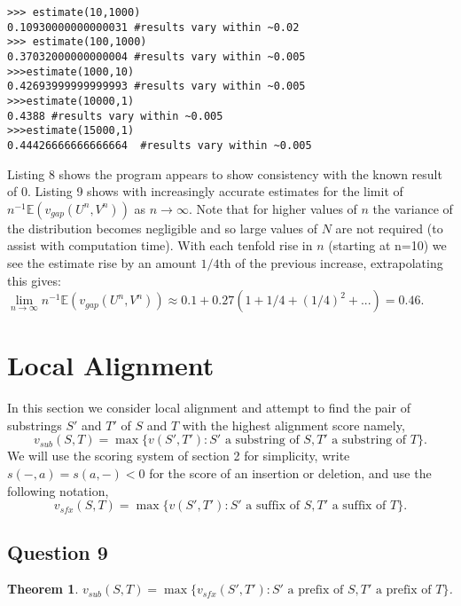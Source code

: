 \documentclass{article}
\newtheorem{theorem}{Theorem}[section]
\begin{document}
\begin{lstlisting}
>>> estimate(10,1000)
0.10930000000000031 #results vary within ~0.02
>>> estimate(100,1000)
0.37032000000000004 #results vary within ~0.005
>>>estimate(1000,10)
0.42693999999999993 #results vary within ~0.005
>>>estimate(10000,1) 
0.4388 #results vary within ~0.005
>>>estimate(15000,1)
0.44426666666666664  #results vary within ~0.005
\end{lstlisting}

Listing 8 shows the program appears to show consistency with the known result of 0. Listing 9 shows with increasingly accurate estimates for the limit of $n^{-1}\mathbb{E}(v_{gap}(U^n,V^n))$ as $n \to \infty$. Note that for higher values of $n$ the variance of the distribution becomes negligible and so large values of $N$ are not required (to assist with computation time). With each tenfold rise in $n$ (starting at n=10) we see the estimate rise by an amount $1/4$th of the previous increase, extrapolating this gives: $\underset{n\to \infty}{\lim} n^{-1}\mathbb{E}(v_{gap}(U^n,V^n)) \approx 0.1+0.27(1+1/4+(1/4)^2+...)=0.46$.

\section{Local Alignment}
In this section we consider local alignment and attempt to find the pair of substrings $S'$ and $T'$ of $S$ and $T$ with the highest alignment score namely,
\begin{equation*}
v_{sub}(S,T) = \max \{ v(S',T'):S' \text{ a substring of } S, T' \text{ a substring of } T \}.
\end{equation*} 
We will use the scoring system of section 2 for simplicity, write $s(-,a)=s(a,-)<0$ for the score of an insertion or deletion, and use the following notation,
\begin{equation*}
v_{sfx}(S,T)=\max \{ v(S',T'):S' \text{ a suffix of } S, T' \text{ a suffix of } T \}.
\end{equation*}

\subsection{Question 9}

\begin{theorem}
$v_{sub}(S,T)= \max \{ v_{sfx}(S',T'):S' \text{ a prefix of } S,T' \text{ a prefix of } T \}$.
\end{theorem}
\end{document}
